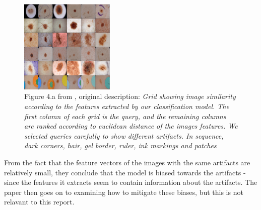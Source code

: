 \begin{figure}[h]
    \centering
    \includegraphics[width=0.4\textwidth]{images/not-so-fast-artifact-query.png}
    \caption{Figure 4.a from \cite{debias-not-so-fast}, original description: \textit{Grid showing image similarity according to the features extracted by our classification model. The first column
            of each grid is the query, and the remaining columns are ranked according to euclidean distance of the images features.
            We selected queries carefully to show different artifacts.
            In sequence, dark corners, hair, gel border, ruler, ink markings and patches}}
    \label{fig:not-so-fast-artifact-query}
\end{figure}

From the fact that the feature vectors of the images with the same artifacts are relatively small,
they conclude that the model is biased towards the artifacts - since the features it extracts seem to contain information about the artifacts.
The paper then goes on to examining how to mitigate these biases, but this is not relavant to this report.